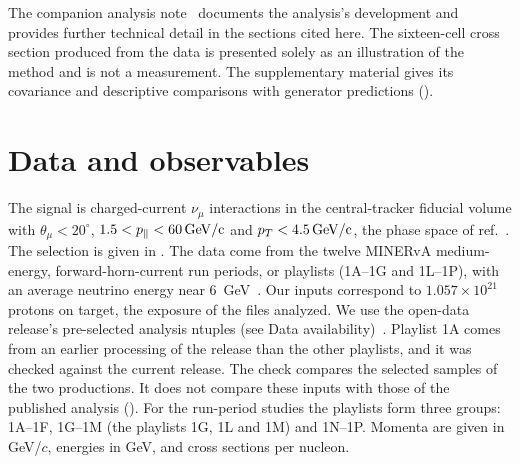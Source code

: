 The companion analysis note~\cite{AnalysisNote2026} documents the analysis's development and provides further technical detail in the sections cited here. The sixteen-cell cross section produced from the data is presented solely as an illustration of the method and is not a measurement. The supplementary material gives its covariance and descriptive comparisons with generator predictions ().
\section{Data and observables}
\label{sec:data}

The signal is charged-current $\nu_\mu$ interactions in the central-tracker fiducial volume with $\theta_\mu<20^{\circ}$, $1.5<p_{\parallel}<\SI{60}{GeV/c}$ and $p_{T}<\SI{4.5}{GeV/c}$, the phase space of ref.~\cite{MINERvA:2021owq}. The selection is given in . The data come from the twelve MINERvA medium-energy, forward-horn-current run periods, or playlists (1A--1G and 1L--1P), with an average neutrino energy near \SI{6}{GeV}~\cite{MINERvA:2021owq}. Our inputs correspond to $1.057\times10^{21}$ protons on target, the exposure of the files analyzed. We use the open-data release's pre-selected analysis ntuples (see Data availability)~\cite{MINERvA:OpenData}. Playlist 1A comes from an earlier processing of the release than the other playlists, and it was checked against the current release. The check compares the selected samples of the two productions. It does not compare these inputs with those of the published analysis (). For the run-period studies the playlists form three groups: 1A--1F, 1G--1M (the playlists 1G, 1L and 1M) and 1N--1P. Momenta are given in GeV/$c$, energies in GeV, and cross sections per nucleon.

